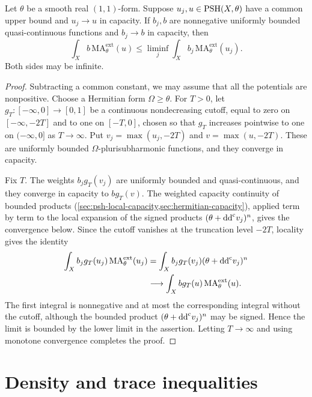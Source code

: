 \begin{lemma}\label{lem:weighted-extended-lsc}\label{lem:big-weighted-lsc}
Let $\theta$ be a smooth real $(1,1)$-form. Suppose $u_j,u\in\mathrm{PSH}(X,\theta)$ have a common upper bound and $u_j\to u$ in capacity. If $b_j,b$ are nonnegative uniformly bounded quasi-continuous functions and $b_j\to b$ in capacity, then
\[
 \int_Xb\,\mathrm{MA}^{\mathrm{ext}}_\theta(u)
 \leq\liminf_j\int_Xb_j\,\mathrm{MA}^{\mathrm{ext}}_\theta(u_j).
\]
Both sides may be infinite.
\end{lemma}
\begin{proof}
Subtracting a common constant, we may assume that all the potentials are nonpositive. Choose a Hermitian form $\Omega\geq\theta$. For $T>0$, let $g_T\colon [-\infty,0]\to[0,1]$ be a continuous nondecreasing cutoff, equal to zero on $[-\infty,-2T]$ and to one on $[-T,0]$, chosen so that $g_T$ increases pointwise to one on $(-\infty,0]$ as $T\to\infty$. Put $v_j=\max(u_j,-2T)$ and $v=\max(u,-2T)$. These are uniformly bounded $\Omega$-plurisubharmonic functions, and they converge in capacity.

Fix $T$. The weights $b_jg_T(v_j)$ are uniformly bounded and quasi-continuous, and they converge in capacity to $bg_T(v)$. The weighted capacity continuity of bounded products (\cref{sec:psh-local-capacity,sec:hermitian-capacity}), applied term by term to the local expansion of the signed products $(\theta+\mathrm{dd}^{\mathrm{c}} v_j)^n$, gives the convergence below. Since the cutoff vanishes at the truncation level $-2T$, locality gives the identity
\[
 \begin{split}
 \int_Xb_jg_T(u_j)\,\mathrm{MA}^{\mathrm{ext}}_\theta(u_j)
 &=\int_Xb_jg_T(v_j)(\theta+\mathrm{dd}^{\mathrm{c}} v_j)^n\\
 &\longrightarrow
 \int_Xbg_T(u)\,\mathrm{MA}^{\mathrm{ext}}_\theta(u).
 \end{split}
\]
The first integral is nonnegative and at most the corresponding integral without the cutoff, although the bounded product $(\theta+\mathrm{dd}^{\mathrm{c}} v_j)^n$ may be signed. Hence the limit is bounded by the lower limit in the assertion. Letting $T\to\infty$ and using monotone convergence completes the proof.
\end{proof}

\section{Density and trace inequalities}
\label{sec:extended-density-inequalities}

